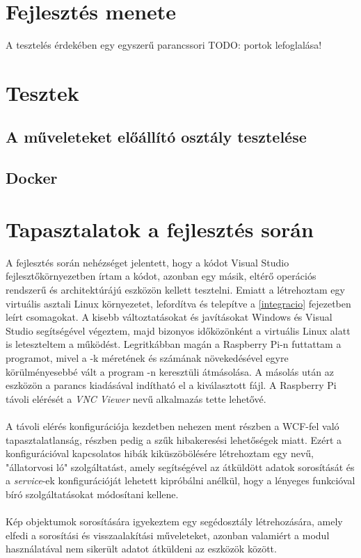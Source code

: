\section{Fejlesztés menete} \label{subs:fejlesztes_menete}


A tesztelés érdekében egy egyszerű parancssori TODO: portok lefoglalása!

\section{Tesztek}

\subsection{A műveleteket előállító osztály tesztelése}

\subsection{Docker}

\section{Tapasztalatok a fejlesztés során}
A fejlesztés során nehézséget jelentett, hogy a kódot Visual Studio fejlesztőkörnyezetben írtam a kódot, azonban egy másik, eltérő operációs rendszerű és architektúrájú eszközön kellett tesztelni. Emiatt a létrehoztam egy virtuális asztali Linux környezetet, lefordítva és telepítve a \ref{integracio} fejezetben leírt csomagokat. A kisebb változtatásokat és javításokat Windows és Visual Studio segítségével végeztem, majd bizonyos időközönként a virtuális Linux alatt is leteszteltem a működést. Legritkábban magán a Raspberry Pi-n futtattam a programot, mivel a -k méretének és számának növekedésével egyre körülményesebbé vált a program -n keresztüli átmásolása. A másolás után az eszközön a  parancs kiadásával indítható el a kiválasztott  fájl. A Raspberry Pi távoli elérését a \textit{VNC Viewer} nevű alkalmazás tette lehetővé.\\
\\
A távoli elérés konfigurációja kezdetben nehezen ment részben a WCF-fel való tapasztalatlanság, részben pedig a szűk hibakeresési lehetőségek miatt. Ezért a konfigurációval kapcsolatos hibák kiküszöbölésére létrehoztam egy  nevű, "állatorvosi ló" szolgáltatást, amely segítségével az átküldött adatok sorosítását és a \textit{service}-ek konfigurációját lehetett kipróbálni anélkül, hogy a lényeges funkcióval bíró szolgáltatásokat módosítani kellene.\\
\\
Kép objektumok sorosítására igyekeztem egy segédosztály létrehozására, amely elfedi a sorosítási és visszaalakítási műveleteket, azonban valamiért a modul használatával nem sikerült adatot átküldeni az eszközök között.
